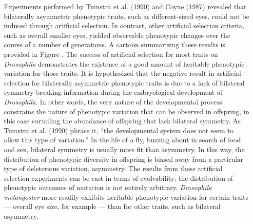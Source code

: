Experiments performed by Tuinstra et al. (1990) and Coyne (1987) revealed that bilaterally asymmetric phenotypic traits, such as different-sized eyes, could not be induced through artificial selection.
In contrast, other artificial selection criteria, such as overall smaller eyes, yielded observable phenotypic changes over the course of a number of generations.
A cartoon summarizing these results is provided in Figure .
The success of artificial selection for most traits on \textit{Drosophila} demonstrates the existence of a good amount of heritable phenotypic variation for those traits.
It is hypothesized that the negative result in artificial selection for bilaterally asymmetric phenotypic traits is due to a lack of bilateral symmetry-breaking information during the embryological development of \textit{Drosophila}.
In other words, the very nature of the developmental process constrains the nature of phenotypic variation that can be observed in offspring, in this case curtailing the abundance of offspring that lack bilateral symmetry. As Tuinstra et al. (1990) phrase it, ``the developmental system does not seem to allow this type of variation.''
In the life of a fly, buzzing about in search of food and sex, bilateral symmetry is usually more fit than asymmetry.
In this way, the distribution of phenotypic diversity in offspring is biased away from a particular type of deleterious variation, asymmetry.
The results from these artificial selection experiments can be cast in terms of evolvability: the distribution of phenotypic outcomes of mutation is not entirely arbitrary.
\textit{Drosophila melangoster}  more readily exhibits heritable phenotypic variation for certain traits --- overall eye size, for example --- than for other traits, such as bilateral asymmetry.

